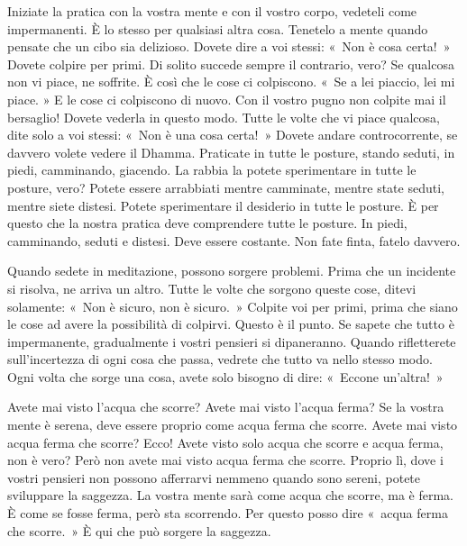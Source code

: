Iniziate la pratica con la vostra mente e con il vostro corpo, vedeteli
come impermanenti. È lo stesso per qualsiasi altra cosa. Tenetelo a
mente quando pensate che un cibo sia delizioso. Dovete dire a voi
stessi: «~Non è cosa certa!~» Dovete colpire per primi. Di solito
succede sempre il contrario, vero? Se qualcosa non vi piace, ne
soffrite. È così che le cose ci colpiscono. «~Se a lei piaccio, lei mi
piace. » E le cose ci colpiscono di nuovo. Con il vostro pugno non
colpite mai il bersaglio! Dovete vederla in questo modo. Tutte le volte
che vi piace qualcosa, dite solo a voi stessi: «~Non è una cosa certa!~»
Dovete andare controcorrente, se davvero volete vedere il Dhamma.
Praticate in tutte le posture, stando seduti, in piedi, camminando,
giacendo. La rabbia la potete sperimentare in tutte le posture, vero?
Potete essere arrabbiati mentre camminate, mentre state seduti, mentre
siete distesi. Potete sperimentare il desiderio in tutte le posture. È
per questo che la nostra pratica deve comprendere tutte le posture. In
piedi, camminando, seduti e distesi. Deve essere costante. Non fate
finta, fatelo davvero.

Quando sedete in meditazione, possono sorgere problemi. Prima che un
incidente si risolva, ne arriva un altro. Tutte le volte che sorgono
queste cose, ditevi solamente: «~Non è sicuro, non è sicuro.~» Colpite
voi per primi, prima che siano le cose ad avere la possibilità di
colpirvi. Questo è il punto. Se sapete che tutto è impermanente,
gradualmente i vostri pensieri si dipaneranno. Quando rifletterete
sull'incertezza di ogni cosa che passa, vedrete che tutto va nello
stesso modo. Ogni volta che sorge una cosa, avete solo bisogno di dire:
«~Eccone un'altra!~»

Avete mai visto l'acqua che scorre? Avete mai visto l'acqua ferma? Se la
vostra mente è serena, deve essere proprio come acqua ferma che scorre.
Avete mai visto acqua ferma che scorre? Ecco! Avete visto solo acqua che
scorre e acqua ferma, non è vero? Però non avete mai visto acqua ferma
che scorre. Proprio lì, dove i vostri pensieri non possono afferrarvi
nemmeno quando sono sereni, potete sviluppare la saggezza. La vostra
mente sarà come acqua che scorre, ma è ferma. È come se fosse ferma,
però sta scorrendo. Per questo posso dire «~acqua ferma che scorre.~» È
qui che può sorgere la saggezza.


